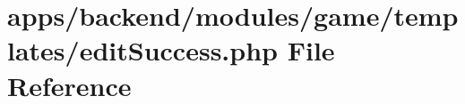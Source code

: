 \hypertarget{backend_2modules_2game_2templates_2edit_success_8php}{\section{apps/backend/modules/game/templates/edit\-Success.php File Reference}
\label{backend_2modules_2game_2templates_2edit_success_8php}
}
